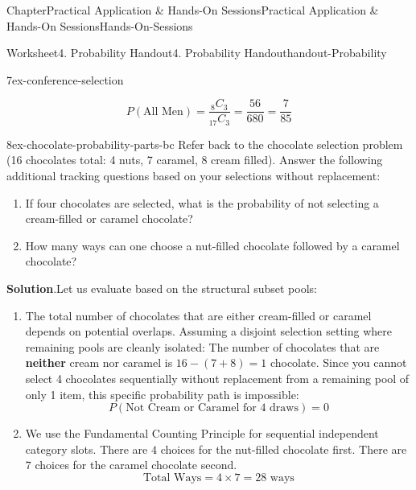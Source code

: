 \documentclass[oneside,10pt,]{book}
\newcommand{\blocktitlefont}{\relax}
\newcommand{\terminology}[1]{\textbf{#1}}
\begin{document}
\begin{chapterptx}{Chapter}{Practical Application \& Hands-On Sessions}{}{Practical Application \& Hands-On Sessions}{}{}{Hands-On-Sessions}
\begin{worksheet-section}{Worksheet}{4. Probability Handout}{}{4. Probability Handout}{}{}{handout-Probability}
\begin{divisionexercise}{7}{}{}{ex-conference-selection}
\begin{enumerate}[label={\alph*}]
\begin{equation*}
P(\text{All Men}) = \frac{_8C_3}{_{17}C_3} = \frac{56}{680} = \frac{7}{85}
\end{equation*}
%
\end{enumerate}
%
\end{divisionexercise}%
\begin{divisionexercise}{8}{}{}{ex-chocolate-probability-parts-bc}%
Refer back to the chocolate selection problem (16 chocolates total: 4 nuts, 7 caramel, 8 cream filled). Answer the following additional tracking questions based on your selections without replacement:%
\begin{enumerate}[label={\alph*}]
\item{}If four chocolates are selected, what is the probability of not selecting a cream-filled or caramel chocolate?%
\item{}How many ways can one choose a nut-filled chocolate followed by a caramel chocolate?%
\end{enumerate}
%
\par\smallskip%
\noindent\textbf{\blocktitlefont Solution}.\hypertarget{ex-chocolate-probability-parts-bc-2}{}\quad{}Let us evaluate based on the structural subset pools:%
\begin{enumerate}[label={\alph*}]
\item{}The total number of chocolates that are either cream-filled or caramel depends on potential overlaps. Assuming a disjoint selection setting where remaining pools are cleanly isolated: The number of chocolates that are \terminology{neither} cream nor caramel is \(16 - (7 + 8) = 1\) chocolate. Since you cannot select 4 chocolates sequentially without replacement from a remaining pool of only 1 item, this specific probability path is impossible:%
\begin{equation*}
P(\text{Not Cream or Caramel for 4 draws}) = 0
\end{equation*}
%
\item{}We use the Fundamental Counting Principle for sequential independent category slots. There are \(4\) choices for the nut-filled chocolate first. There are \(7\) choices for the caramel chocolate second.%
\begin{equation*}
\text{Total Ways} = 4 \times 7 = 28 \text{ ways}
\end{equation*}
%
\end{enumerate}
%
\end{divisionexercise}%
\end{worksheet-section}
\restoregeometry

\end{chapterptx}
\end{document}
